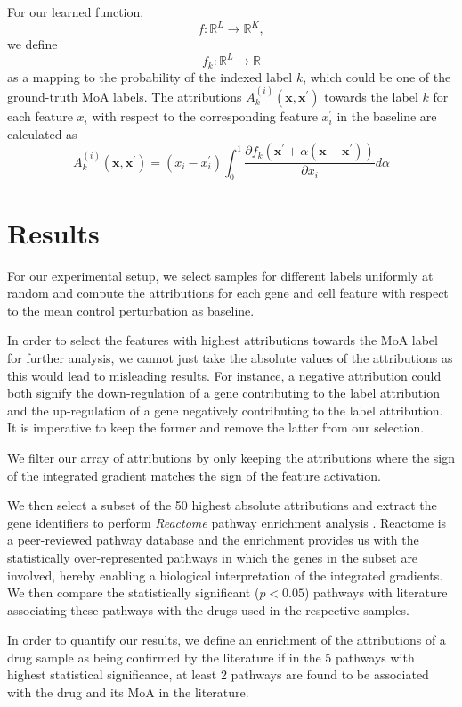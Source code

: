 \documentclass[bsc,frontabs,twoside,singlespacing,parskip,deptreport]{infthesis}     %
\let\Oldsection\section
\renewcommand{\section}{\FloatBarrier\Oldsection}
\begin{document}
For our learned function, \[f: \mathbb{R}^{L} \rightarrow \mathbb{R}^{K},\] we define \[f_{k}: \mathbb{R}^{L} \rightarrow \mathbb{R}\] as a mapping to the probability of the indexed label \(k\), which could be one of the ground-truth MoA labels. The attributions \(A_{k}^{(i)}\left(\mathbf{x}, \mathbf{x}^{\prime}\right)\) towards the label \(k\) for each feature \(x_{i}\) with respect to the corresponding feature \(x_{i}^{\prime}\) in the baseline are calculated as
\[ A_{k}^{(i)}\left(\mathbf{x}, \mathbf{x}^{\prime}\right)=\left(x_{i}-x_{i}^{\prime}\right) \int_{0}^{1} \frac{\partial f_{k}\left(\mathbf{x}^{\prime}+\alpha\left(\mathbf{x}-\mathbf{x}^{\prime}\right)\right)}{\partial x_{i}} d \alpha \]

\section{Results}
For our experimental setup, we select samples for different labels uniformly at random and compute the attributions for each gene and cell feature with respect to the mean control perturbation as baseline.

In order to select the features with highest attributions towards the MoA label for further analysis, we cannot just take the absolute values of the attributions as this would lead to misleading results. For instance, a negative attribution could both signify the down-regulation of a gene contributing to the label attribution and the up-regulation of a gene negatively contributing to the label attribution. It is imperative to keep the former and remove the latter from our selection.

We filter our array of attributions by only keeping the attributions where the sign of the integrated gradient matches the sign of the feature activation.

We then select a subset of the 50 highest absolute attributions and extract the gene identifiers to perform \textit{Reactome} pathway enrichment analysis \cite{fabregat_reactome_2017}. Reactome is a peer-reviewed pathway database and the enrichment provides us with the statistically over-represented pathways in which the genes in the subset are involved, hereby enabling a biological interpretation of the integrated gradients.
We then compare the statistically significant (\(p < 0.05\)) pathways with literature associating these pathways with the drugs used in the respective samples.

In order to quantify our results, we define an enrichment of the attributions of a drug sample as being confirmed by the literature if in the 5 pathways with highest statistical significance,  at least 2 pathways are found to be associated with the drug and its MoA in the literature.
\end{document}
